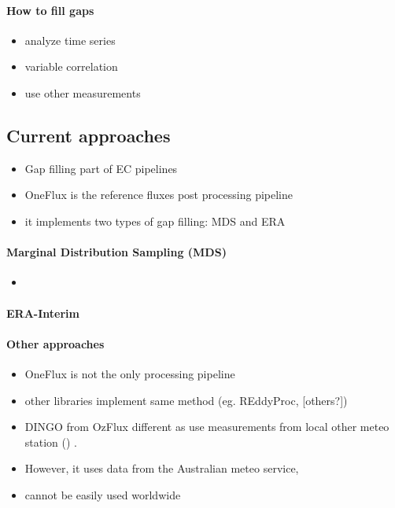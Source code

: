 \documentclass{article}
\let\Oldsubsection\subsection
\renewcommand{\subsection}{\FloatBarrier\Oldsubsection}
\begin{document}
\paragraph{How to fill gaps}

\begin{itemize}
    \item analyze time series
    \item variable correlation
    \item use other measurements
\end{itemize}


\subsection{Current approaches}

\begin{itemize}
\item Gap filling part of EC pipelines
\item OneFlux is the reference fluxes post processing pipeline
\item it implements two types of gap filling: MDS and ERA
\end{itemize}
\paragraph{Marginal Distribution Sampling (MDS)}
\begin{itemize}
        \item 
    \end{itemize}

\paragraph{ERA-Interim}

\paragraph{Other approaches}
\begin{itemize}
\item OneFlux is not the only processing pipeline
\item other libraries implement same method (eg. REddyProc, [others?])
\item DINGO from OzFlux different as use measurements from local other meteo station (\cite{beringer_technical_2017}) . 
\item However, it uses data from the Australian meteo service,
\item cannot be easily used worldwide
\end{itemize}
\end{document}

